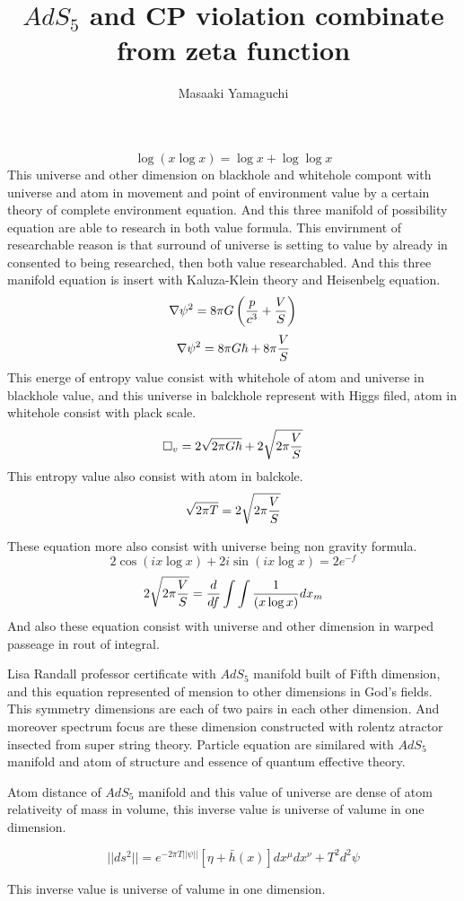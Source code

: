 \documentclass{jsarticle}
\begin{document}
  $$ \log(x \log x) = \log x + \log \log x $$
  This universe and other dimension on blackhole and whitehole
  compont with universe and atom in movement and point of 
  environment value by a certain theory of complete environment 
  equation. And this three manifold of possibility equation 
  are able to research in both value formula.
  This envirnment of researchable reason is that surround of universe
  is setting to value by already in consented to being researched,
  then both value researchabled.
  And this three manifold equation is insert with Kaluza-Klein theory
  and Heisenbelg equation.
    $$ \nabla \psi^2 = 8 \pi G\left({p \over c^3} + {V \over S}\right) $$
  $$ \nabla \psi^2 = 8 \pi G \hbar + 8 \pi {V \over S} $$
  This energe of entropy value consist with whitehole of atom
  and universe in blackhole value, and this universe in balckhole 
  represent with Higgs filed, atom in whitehole consist with plack scale.
    $$ \square_v = 2 \sqrt{2 \pi G \hbar} + 2 \sqrt{2 \pi {V \over S}} $$
  This entropy value also consist with atom in balckole.
    $$ \sqrt{2 \pi T} = 2 \sqrt{2 \pi{V \over S}} $$

  These equation more also consist with universe being non gravity formula.
    $$ 2 \cos (i x \log x) + 2 i \sin(i x \log x) = 2 e^{-f} $$
  $$ 2 \sqrt{2 \pi {V \over S}} = {d \over df} 
  \int \int{1 \over (x \log x)}dx_m$$
  And also these equation consist with universe and other dimension in
  warped passeage in rout of integral.

\newpage
\title{$AdS_5 $ and CP violation combinate from zeta function}
\author{Masaaki Yamaguchi}


    Lisa Randall professor certificate with $AdS_5 $ manifold built of
  Fifth dimension, and this equation represented of 
  mension to other dimensions in God's fields.
  This symmetry dimensions are each of two pairs in each other dimension.
  And moreover spectrum focus are these dimension constructed with
  rolentz atractor insected from super string theory.
   Particle equation are similared with $AdS_5 $ manifold and atom of structure
   and essence of quantum effective theory.

    Atom distance of $AdS_5 $ manifold and this value of universe are dense of 
  atom relativeity of mass in volume, this inverse value is universe of valume
  in one dimension.

  $$ ||ds^2|| = e^{-2\pi T||\psi||}[\eta + \bar{h}(x)]dx^{\mu}dx^{\nu}
  + T^2 d^2 \psi $$

     This inverse value is universe of valume in one dimension.
\end{document}
